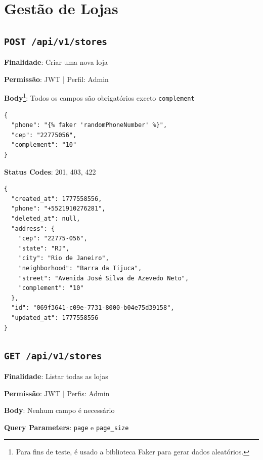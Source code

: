 \section{Gestão de Lojas}

\subsection{\texttt{POST /api/v1/stores}}

\noindent\textbf{Finalidade}: Criar uma nova loja

\noindent\textbf{Permissão}: JWT | Perfil: Admin

\noindent\textbf{Body}\footnote{Para fins de teste, é usado a biblioteca Faker para gerar dados aleatórios.}:
Todos os campos são obrigatórios exceto \texttt{complement}

\vspace{-0.2cm}

\begin{verbatim}
{
  "phone": "{% faker 'randomPhoneNumber' %}",
  "cep": "22775056",
  "complement": "10"
}
\end{verbatim}

\noindent\textbf{Status Codes}: 201, 403, 422

\begin{tcolorbox}[colback=green!5, colframe=black, title=\textbf{201 Created}]
\begin{verbatim}
{
  "created_at": 1777558556,
  "phone": "+5521910276281",
  "deleted_at": null,
  "address": {
    "cep": "22775-056",
    "state": "RJ",
    "city": "Rio de Janeiro",
    "neighborhood": "Barra da Tijuca",
    "street": "Avenida José Silva de Azevedo Neto",
    "complement": "10"
  },
  "id": "069f3641-c09e-7731-8000-b04e75d39158",
  "updated_at": 1777558556
}
\end{verbatim}
\end{tcolorbox}

\subsection{\texttt{GET /api/v1/stores}}

\noindent\textbf{Finalidade}: Listar todas as lojas

\noindent\textbf{Permissão}: JWT | Perfis: Admin

\noindent\textbf{Body}: Nenhum campo é necessário

\noindent\textbf{Query Parameters}: \texttt{page} e \texttt{page\_size}

